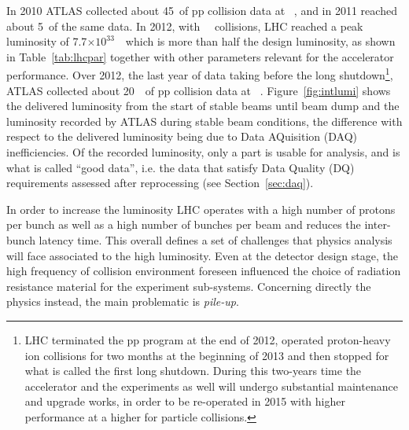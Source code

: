 In 2010 ATLAS collected about 45~\ipb of pp collision data at ~\tev, and in
2011 reached about 5~\ifb of the same data.
In 2012, with  ~\tev\ collisions, LHC reached a peak luminosity of 7.7$\times10^{33}$~\ which is
more than half the design luminosity, as shown in Table~\ref{tab:lhcpar} together
with other parameters relevant for the accelerator performance. 
Over 2012, the last
year of data taking before the long shutdown\footnote{LHC terminated the pp program
at the end of 2012, operated proton-heavy ion collisions for two months at the beginning
of 2013 and then stopped for what is called the first long shutdown. During this two-years
time the accelerator and the experiments as well will undergo substantial maintenance and 
upgrade works, in order to be re-operated in 2015 with higher performance at a higher
\cme for particle collisions.},
ATLAS collected about 20~\ifb\ of pp collision data at ~\tev.
Figure~\ref{fig:intlumi} shows the delivered luminosity from the start of stable beams until beam dump and the luminosity recorded by
ATLAS during stable beam conditions, the difference with respect to the delivered luminosity being due to Data AQuisition (DAQ)
inefficiencies. Of the recorded luminosity, only a part is usable for analysis, and is what is called ``good data'', i.e. 
the data that satisfy Data Quality (DQ) requirements assessed after reprocessing (see Section~\ref{sec:daq}).

In order to increase the luminosity LHC operates with a high number of protons per bunch as well as a high
 number of bunches per beam and reduces the inter-bunch latency time.
This overall defines a set of challenges that physics analysis will face associated to the high luminosity.
Even at the detector design stage, the high frequency of collision environment foreseen influenced
the choice of radiation resistance material for the experiment sub-systems. Concerning directly the physics
instead, the main problematic is \textit{pile-up}.

